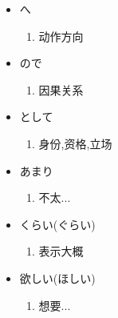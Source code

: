 \begin{itemize}
\begin{enumerate}
            \end{enumerate}
        \item へ
            \begin{enumerate}
                \item 动作方向
            \end{enumerate}
        \item ので
            \begin{enumerate}
                \item 因果关系
            \end{enumerate}
        \item として
            \begin{enumerate}
                \item 身份,资格,立场
            \end{enumerate}
        \item あまり
            \begin{enumerate}
                \item 不太...
            \end{enumerate}
        \item くらい(ぐらい)
            \begin{enumerate}
                \item 表示大概
            \end{enumerate}
        \item 欲しい(ほしい)
            \begin{enumerate}
                \item 想要...
            \end{enumerate}
    \end{itemize}

